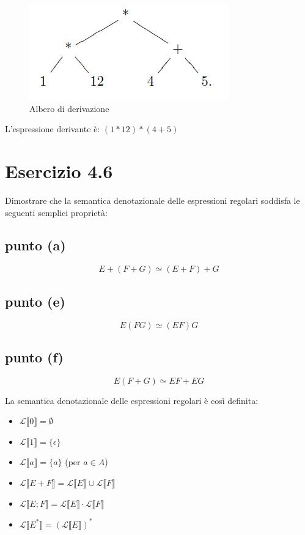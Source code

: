 		\begin{figure}[h]
			\centering
			\includegraphics[scale=0.5]{img/3-13}
			\caption{Albero di derivazione}
		\end{figure}
		
		\sectionline
		
		L'espressione derivante è: $(1*12)*(4+5)$
		
		\newpage
	
	\newpage \section{Esercizio 4.6}
		Dimostrare che la semantica denotazionale delle espressioni regolari
		soddisfa le seguenti semplici proprietà:
		\subsection{punto (a)}
			$$E+(F+G) \simeq (E+F)+G$$
		\subsection{punto (e)}
			$$E(FG) \simeq (EF)G$$
		\subsection{punto (f)}
			$$E(F+G) \simeq EF+EG$$
			
		\sectionline
		
		La semantica denotazionale delle espressioni regolari è così definita:
		\begin{itemize}
		  \item $\mathcal{L} \llbracket 0 \rrbracket = \emptyset$
		  \item $\mathcal{L} \llbracket 1 \rrbracket = \{\epsilon\}$
		  \item $\mathcal{L} \llbracket a \rrbracket = \{a\}$ (per $a \in A$)
		  \item $\mathcal{L} \llbracket E + F \rrbracket = \mathcal{L} \llbracket E
		  	\rrbracket \cup \mathcal{L} \llbracket F
		  	\rrbracket$
		  \item $\mathcal{L} \llbracket E ; F \rrbracket = \mathcal{L} \llbracket E
		  	\rrbracket \cdot \mathcal{L} \llbracket F
		  	\rrbracket$ 
		  \item $\mathcal{L} \llbracket E^* \rrbracket = (\mathcal{L} \llbracket E
		  	\rrbracket)^*$ 
		\end{itemize}
		
